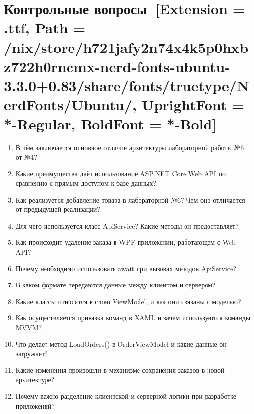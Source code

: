 \documentclass[12pt]{article}
\newcommand{\icon}[1]{\fontspec{UbuntuNerdFont}[Extension = .ttf,
  Path = /nix/store/h721jafy2n74x4k5p0hxbz722h0rncmx-nerd-fonts-ubuntu-3.3.0+0.83/share/fonts/truetype/NerdFonts/Ubuntu/,
  UprightFont = *-Regular,
BoldFont = *-Bold] #1}
\newcommand{\iicon}[1]{{\icon{#1}}}
\renewcommand{\texttt}[1]{{\small\ttfamily #1}}
\numberwithin{listing}{section}
\numberwithin{figure}{section}
\begin{document}
\newpage

\section{Контрольные вопросы~\texorpdfstring{\iicon{}}{}}
\begin{enumerate}
	\item В чём заключается основное отличие архитектуры лабораторной работы №6 от №4?
	\item Какие преимущества даёт использование ASP.NET Core Web API по сравнению с прямым доступом к базе данных?
	\item Как реализуется добавление товара в лабораторной №6? Чем оно отличается от предыдущей реализации?
	\item Для чего используется класс \texttt{ApiService}? Какие методы он предоставляет?
	\item Как происходит удаление заказа в WPF-приложении, работающем с Web API?
	\item Почему необходимо использовать \texttt{await} при вызовах методов \texttt{ApiService}?
	\item В каком формате передаются данные между клиентом и сервером?
	\item Какие классы относятся к слою ViewModel, и как они связаны с моделью?
	\item Как осуществляется привязка команд в XAML и зачем используются команды MVVM?
	\item Что делает метод \texttt{LoadOrders()} в \texttt{OrderViewModel} и какие данные он загружает?
	\item Какие изменения произошли в механизме сохранения заказов в новой архитектуре?
	\item Почему важно разделение клиентской и серверной логики при разработке приложений?
\end{enumerate}
\end{document}
